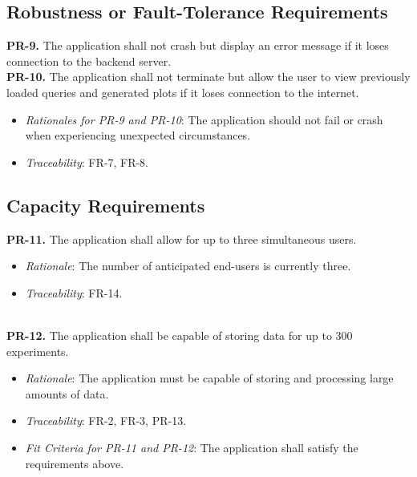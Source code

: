 \documentclass[12pt]{article}
\begin{document}
\subsection{Robustness or Fault-Tolerance Requirements}
\textbf{PR-9.} The application shall not crash but display an error message if it loses connection to the backend server.\\
\newline
\textbf{PR-10.} The application shall not terminate but allow the user to view previously loaded queries and generated plots if it loses connection to the internet.

\begin{itemize}
  \item \textit{Rationales for PR-9 and PR-10}: The application should not fail or crash when experiencing unexpected circumstances.
  \item \textit{Traceability}: FR-7, FR-8.
\end{itemize}

\subsection{Capacity Requirements}
\textbf{PR-11.} The application shall allow for up to three simultaneous users.
    \begin{itemize}
      \item \textit{Rationale}: The number of anticipated end-users is currently three.
      \item \textit{Traceability}: FR-14.
    \end{itemize}
\ \\
\textbf{PR-12.} The application shall be capable of storing data for up to 300 experiments.
    \begin{itemize}
      \item \textit{Rationale}: The application must be capable of storing and processing large amounts of data.
      \item \textit{Traceability}: FR-2, FR-3, PR-13.
    \end{itemize}

\begin{itemize}
  \item \textit{Fit Criteria for PR-11 and PR-12}: The application shall satisfy the requirements above.
\end{itemize}
\end{document}
